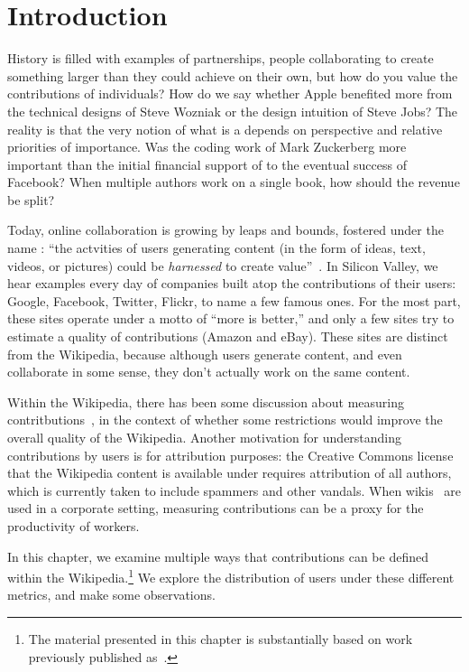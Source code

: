 
\section{Introduction}

History is filled with examples of partnerships, people collaborating
to create something larger than they could achieve on their own,
but how do you value the contributions of individuals?
How do we say whether Apple benefited more from the technical
designs of Steve Wozniak or the design intuition of Steve Jobs?
The reality is that the very notion of what is a 
depends on perspective and relative priorities of importance.
Was the coding work of Mark Zuckerberg more important than
the initial financial support of  to the eventual
success of Facebook?  
When multiple authors work on a single book, how should the
revenue be split?

Today, online collaboration is growing by leaps and bounds,
fostered under the name : ``the actvities of
users generating content (in the form of ideas, text,
videos, or pictures) could be \textit{harnessed} to
create value''~\cite{wiki:Web20}.
In Silicon Valley, we hear examples every day of companies
built atop the contributions of their users:
Google, Facebook, Twitter, Flickr, to name a few famous ones.
For the most part, these sites operate under a motto
of ``more is better,'' and only a few sites try to estimate
a quality of contributions (\eg Amazon and eBay).
These sites are distinct from the Wikipedia, because although
users generate content, and even collaborate in some sense,
they don't actually work on the same content.

Within the Wikipedia, there has been some discussion
about measuring contritbutions~\cite{Wales2005,Swartz2006},
in the context of whether some restrictions would improve
the overall quality of the Wikipedia.
Another motivation for understanding contributions by
users is for attribution purposes: the Creative Commons license
that the Wikipedia content is available under requires attribution
of all authors, which is currently taken to include spammers
and other vandals.
When wikis~\cite{Leuf2001} are used in a corporate setting,
measuring contributions can be a proxy for the productivity
of workers.

In this chapter, we examine multiple ways that contributions
can be defined within the Wikipedia.\footnote{The material
presented in this chapter is substantially based on work
previously published as~\cite{AuthorContrib2008}.}
We explore the distribution of users under these different metrics,
and make some observations.

